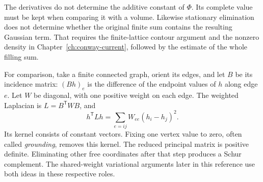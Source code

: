 The derivatives do not determine the additive constant of $\Phi$.
Its complete value must be kept when comparing it with a volume.
Likewise stationary elimination does not determine whether the
original finite sum contains the resulting Gaussian term. That
requires the finite-lattice contour argument and the nonzero density
in Chapter~\ref{ch:conway-current}, followed by the estimate of the
whole filling sum.

For comparison, take a finite connected graph, orient its edges, and
let $B$ be its incidence matrix: $(Bh)_e$ is the difference of the
endpoint values of $h$ along edge $e$. Let $W$ be diagonal, with one
positive weight on each edge. The weighted Laplacian is
$L=B^{\mathsf T}WB$, and
\[
 h^{\mathsf T}Lh=\sum_{e=ij}W_{ee}(h_i-h_j)^2.
\]
Its kernel consists of constant vectors. Fixing one vertex value to
zero, often called \emph{grounding}, removes this kernel. The reduced principal matrix is positive definite. Eliminating
other free coordinates after that step produces a Schur complement.
The shared-weight variational arguments later in this reference use
both ideas in these respective roles.
